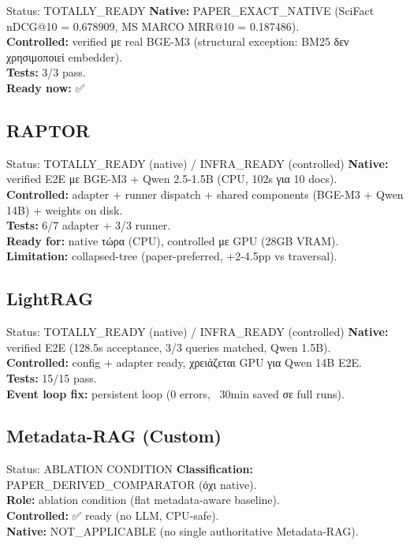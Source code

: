 \documentclass[11pt,a4paper]{article}
\begin{document}
\begin{okbox}{Status: TOTALLY\_READY}
\textbf{Native:} PAPER\_EXACT\_NATIVE (SciFact nDCG@10 = 0.678909, MS MARCO MRR@10 = 0.187486). \\
\textbf{Controlled:} verified με real BGE-M3 (structural exception: BM25 δεν χρησιμοποιεί embedder). \\
\textbf{Tests:} 3/3 pass. \\
\textbf{Ready now:} ✅
\end{okbox}

\subsection{RAPTOR}

\begin{okbox}{Status: TOTALLY\_READY (native) / INFRA\_READY (controlled)}
\textbf{Native:} verified E2E με BGE-M3 + Qwen 2.5-1.5B (CPU, 102s για 10 docs). \\
\textbf{Controlled:} adapter + runner dispatch + shared components (BGE-M3 + Qwen 14B) + weights on disk. \\
\textbf{Tests:} 6/7 adapter + 3/3 runner. \\
\textbf{Ready for:} native τώρα (CPU), controlled με GPU (28GB VRAM). \\
\textbf{Limitation:} collapsed-tree (paper-preferred, +2-4.5pp vs traversal).
\end{okbox}

\subsection{LightRAG}

\begin{okbox}{Status: TOTALLY\_READY (native) / INFRA\_READY (controlled)}
\textbf{Native:} verified E2E (128.5s acceptance, 3/3 queries matched, Qwen 1.5B). \\
\textbf{Controlled:} config + adapter ready, χρειάζεται GPU για Qwen 14B E2E. \\
\textbf{Tests:} 15/15 pass. \\
\textbf{Event loop fix:} persistent loop (0 errors, ~30min saved σε full runs).
\end{okbox}

\subsection{Metadata-RAG (Custom)}

\begin{okbox}{Status: ABLATION CONDITION}
\textbf{Classification:} PAPER\_DERIVED\_COMPARATOR (όχι native). \\
\textbf{Role:} ablation condition (flat metadata-aware baseline). \\
\textbf{Controlled:} ✅ ready (no LLM, CPU-safe). \\
\textbf{Native:} NOT\_APPLICABLE (no single authoritative Metadata-RAG).
\end{okbox}
\end{document}
